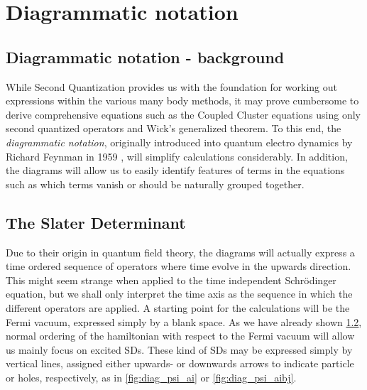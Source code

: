 
\chapter{Diagrammatic notation} %

\label{Chapter3} %



\section{Diagrammatic notation - background}

While Second Quantization provides us with the foundation for working out expressions within the various many body methods, it may prove cumbersome to derive comprehensive equations such as the Coupled Cluster equations using only second quantized operators and Wick's generalized theorem. To this end, the \emph{diagrammatic notation}, originally introduced into quantum electro dynamics by Richard Feynman in 1959 \cite[p.1]{ShavittBartlett2009}, will simplify calculations considerably. In addition, the diagrams will allow us to easily identify features of terms in the equations such as which terms vanish or should be naturally grouped together. \cite{ShavittBartlett2009}

\section{The Slater Determinant}

Due to their origin in quantum field theory, the diagrams will actually express a time ordered sequence of operators where time evolve in the upwards direction. This might seem strange when applied to the time independent Schrödinger equation, but we shall only interpret the time axis as the sequence in which the different operators are applied. A starting point for the calculations will be the Fermi vacuum, expressed simply by a blank space. As we have already shown \ref{}, normal ordering of the hamiltonian with respect to the Fermi vacuum will allow us mainly focus on excited SDs. These kind of SDs may be expressed simply by vertical lines, assigned either upwards- or downwards arrows to indicate particle or holes, respectively, as in \ref{fig:diag_psi_ai} or \ref{fig:diag_psi_aibj}. 

